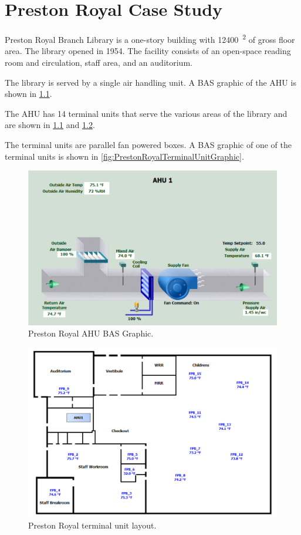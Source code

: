 \chapter{Preston Royal Case Study}

Preston Royal Branch Library is a one-story building with \SI{12400}{\feet\squared} of gross floor area. The
library opened in 1954. The facility consists of an open-space reading room and circulation, staff
area, and an auditorium.

The library is served by a single air handling unit. A BAS graphic of
the AHU is shown in \figref{} \ref{fig:PrestonRoyalAHUGraphic}. 

The AHU has 14 terminal units that serve the various areas of the
library and are shown in \figref{} \ref{fig:PrestonRoyalAHUGraphic} and
\ref{fig:PrestonRoyalTerminalUnitLayout}.

The terminal units are parallel fan powered boxes. A BAS graphic of one
of the terminal units is shown in \figref{}
\ref{fig:PrestonRoyalTerminalUnitGraphic}.

\begin{figure}
\centering
\includegraphics[width=\textwidth]{Images/PrestonRoyalAHUGraphic.PNG}
\caption{Preston Royal AHU BAS Graphic.}
\label{fig:PrestonRoyalAHUGraphic}
\end{figure}

\begin{figure}
\centering
\includegraphics[width=\textwidth]{Images/PrestonRoyalFPBLayoutGraphic.PNG}
\caption{Preston Royal terminal unit layout.}
\label{fig:PrestonRoyalTerminalUnitLayout}
\end{figure}

